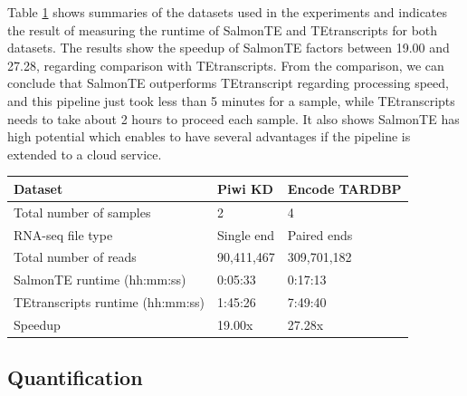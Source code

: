 \documentclass{ws-procs11x85}
\begin{document}
Table \ref{aba:table1} shows summaries of the datasets used in the experiments and indicates the result of measuring the runtime of SalmonTE and TEtranscripts for both datasets. 
The results show the speedup of SalmonTE factors between 19.00 and 27.28,
regarding comparison with TEtranscripts. %
From the comparison, we can conclude that SalmonTE outperforms TEtranscript regarding processing speed, and this pipeline just took less than 5 minutes for a sample, while TEtranscripts needs to take about 2 hours to proceed each sample. It also shows SalmonTE has high potential which enables to have several advantages if the pipeline is extended to a cloud service.

\begin{table}[h]
{\begin{tabular}{l|ll}
\hline
Dataset                          & Piwi KD\cite{ohtani2013dmgtsf1}    & Encode TARDBP \\ \hline
Total number of samples          & 2          & 4             \\ 
RNA-seq file type                & Single end & Paired ends  \\ 
Total number of reads            & 90,411,467 & 309,701,182   \\ \hline
SalmonTE runtime (hh:mm:ss)      & 0:05:33    & 0:17:13       \\
TEtranscripts runtime (hh:mm:ss) & 1:45:26    & 7:49:40       \\
Speedup                          & 19.00x     & 27.28x        \\ \hline
\end{tabular}}\label{aba:table1}
\end{table}

\subsection{Quantification}
\end{document}
